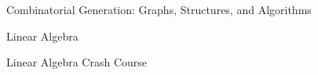 \vspace{1 mm}


\begin{cvtalks}
  \cvtalk
  {Combinatorial Generation: Graphs, Structures, and Algorithms}
  {}
  {
    \begin{cvitems}
      \item {} \hfill {} 
    \end{cvitems}
  }
\end{cvtalks}

\vspace{1 mm}


\begin{cvtalks}
  \cvtalk
  {Linear Algebra}
  {}
  {
    \begin{cvitems}
      \item {} \hfill {} 
    \end{cvitems}
  }
  \cvtalk
  {Linear Algebra Crash Course}
  {}
  {
    \begin{cvitems}
      \item {} \hfill {} 
    \end{cvitems}
  }

\end{cvtalks}